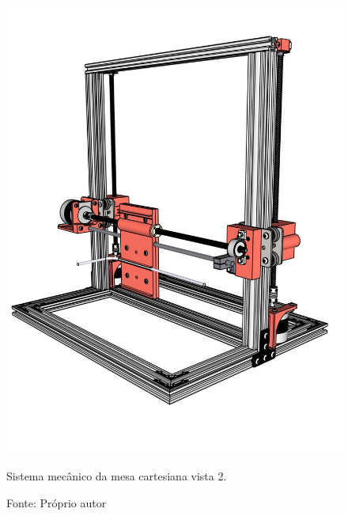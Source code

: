 \begin{figure}[H]
\centering
\includegraphics[scale = 0.45]{figuras/mesacartesiana02}
\caption{Sistema mecânico da mesa cartesiana vista 2.}
\caption*{Fonte: Próprio autor}
\label{fig:mesacartesiana02}
\end{figure}

